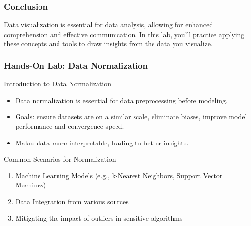 \documentclass[aspectratio=169]{beamer}
\begin{document}
\begin{frame}
    \frametitle{Conclusion}
    Data visualization is essential for data analysis, allowing for enhanced comprehension and effective communication. In this lab, you'll practice applying these concepts and tools to draw insights from the data you visualize.
\end{frame}

\begin{frame}[fragile]
    \frametitle{Hands-On Lab: Data Normalization}
    \begin{block}{Introduction to Data Normalization}
        \begin{itemize}
            \item Data normalization is essential for data preprocessing before modeling.
            \item Goals: ensure datasets are on a similar scale, eliminate biases, improve model performance and convergence speed.
            \item Makes data more interpretable, leading to better insights.
        \end{itemize}
    \end{block}
    \begin{block}{Common Scenarios for Normalization}
        \begin{enumerate}
            \item Machine Learning Models (e.g., k-Nearest Neighbors, Support Vector Machines)
            \item Data Integration from various sources
            \item Mitigating the impact of outliers in sensitive algorithms
        \end{enumerate}
    \end{block}
\end{frame}
\end{document}
